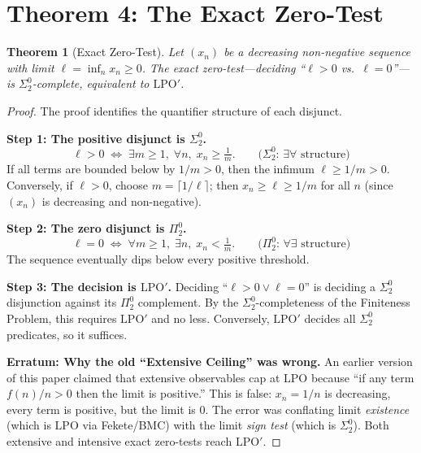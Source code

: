 \documentclass[11pt,a4paper]{article}
\theoremstyle{plain}
\newtheorem{theorem}{Theorem}[section]
\theoremstyle{definition}
\newcommand{\LPO}{\ensuremath{\mathrm{LPO}}}
\newcommand{\LPOj}{\ensuremath{\mathrm{LPO'}}}
\begin{document}
\section{Theorem 4: The Exact Zero-Test}\label{sec:zerotest}

\begin{theorem}[Exact Zero-Test]\label{thm:zerotest}
Let $(x_n)$ be a decreasing non-negative sequence with limit
$\ell = \inf_n x_n \geq 0$.  The exact zero-test---deciding
``$\ell > 0$ vs.\ $\ell = 0$''---is $\Sigma_2^0$-complete,
equivalent to $\LPOj$.
\end{theorem}

\begin{proof}
The proof identifies the quantifier structure of each disjunct.

\medskip\noindent
\textbf{Step 1: The positive disjunct is $\Sigma_2^0$.}
\[
  \ell > 0 \;\Longleftrightarrow\;
  \exists m \geq 1,\; \forall n,\;
  x_n \geq \tfrac{1}{m}.
  \qquad\text{($\Sigma_2^0$: $\exists\forall$ structure)}
\]
If all terms are bounded below by $1/m > 0$, then the infimum
$\ell \geq 1/m > 0$.  Conversely, if $\ell > 0$, choose
$m = \lceil 1/\ell \rceil$; then $x_n \geq \ell \geq 1/m$
for all $n$ (since $(x_n)$ is decreasing and non-negative).

\medskip\noindent
\textbf{Step 2: The zero disjunct is $\Pi_2^0$.}
\[
  \ell = 0 \;\Longleftrightarrow\;
  \forall m \geq 1,\; \exists n,\;
  x_n < \tfrac{1}{m}.
  \qquad\text{($\Pi_2^0$: $\forall\exists$ structure)}
\]
The sequence eventually dips below every positive threshold.

\medskip\noindent
\textbf{Step 3: The decision is $\LPOj$.}
Deciding ``$\ell > 0 \lor \ell = 0$'' is deciding a $\Sigma_2^0$
disjunction against its $\Pi_2^0$ complement.  By the
$\Sigma_2^0$-completeness of the Finiteness Problem, this requires
$\LPOj$ and no less.  Conversely, $\LPOj$ decides all $\Sigma_2^0$
predicates, so it suffices.

\medskip\noindent
\textbf{Erratum: Why the old ``Extensive Ceiling'' was wrong.}
An earlier version of this paper claimed that extensive observables
cap at $\LPO$ because ``if any term $f(n)/n > 0$ then the
limit is positive.''  This is false: $x_n = 1/n$ is decreasing,
every term is positive, but the limit is $0$.  The error was
conflating limit \emph{existence} (which is $\LPO$ via
Fekete/BMC) with the limit \emph{sign test} (which is $\Sigma_2^0$).
Both extensive and intensive exact zero-tests reach $\LPOj$.
\end{proof}
\end{document}
